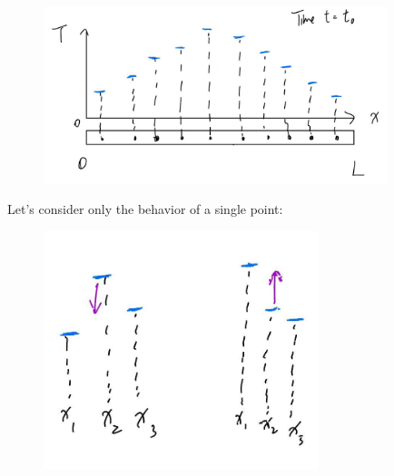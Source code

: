 \documentclass{article}
\begin{document}
\newpage
\begin{figure}[h]
    \centering
    \includegraphics[width=10cm]{DE-ch4-heat3.jpg}
\end{figure}
Let's consider only the behavior of a single point:
\begin{figure}[h]
    \centering
    \includegraphics[width=8cm]{DE-ch4-heat4.jpg}
\end{figure}
\end{document}
